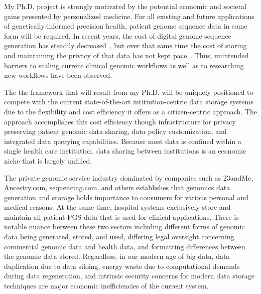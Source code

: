 \documentclass[a4paper,11pt]{article}
\begin{document}
\begin{refsection}
My Ph.D. project is strongly motivated by the potential economic and societal gains presented by personalized medicine. 
For all existing and future applications of genetically-informed precision health, patient genome sequence data in some form will be required.
In recent years, the cost of digital genome sequence generation has steadily decreased~\cite{wetterstrand_cost_2021}, but over that same time the cost of storing and maintaining the privacy of that data has not kept pace~\cite{}.
Thus, unintended barriers to scaling current clinical genomic workflows as well as to researching new workflows have been observed.

The the framework that will result from my Ph.D. will be uniquely positioned to compete with the current state-of-the-art intitiution-centric data storage systems due to the flexibility and cost efficiency it offers as a citizen-centric approach.
The approach accomplishes this cost efficiency though infrastructure for privacy preserving patient genomic data sharing, data policy customization, and integrated data querying capabilities.
Because most data is confined within a single health care institution, data sharing between institutions is an economic niche that is largely unfilled. 

The private genomic service industry dominated by companies such as 23andMe, Ancestry.com, sequencing.com, and others establishes that genomics data generation and storage holds importance to consumers for various personal and medical reasons. 
At the same time, hospital systems exclusively store and maintain all patient PGS data that is used for clinical applications. 
There is notable nuance between these two sectors including different forms of genomic data being generated, stored, and used, differing legal oversight concerning commercial genomic data and health data, and formatting differences between the genomic data stored. 
Regardless, in our modern age of big data, data duplication due to data siloing, energy waste due to computational demands during data regeneration, and intrinsic security concerns for modern data storage techniques are major economic inefficiencies of the current system. 


\end{refsection}
\end{document}

